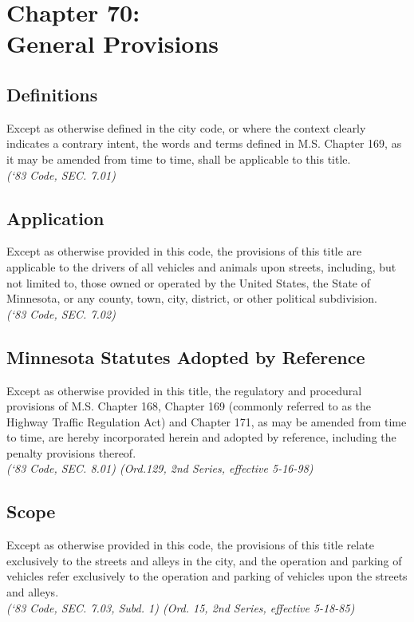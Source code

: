 \chapter*{Chapter 70: \\
	General Provisions}
    \minitoc
    \pagebreak

\section{Definitions}
Except as otherwise defined in the city code, or where the context clearly indicates a contrary intent, the words and terms defined in M.S. Chapter 169, as it may be amended from time to time, shall be applicable to this title.\\
\emph{(‘83 Code, SEC. 7.01)}
\section{Application}
Except as otherwise provided in this code, the provisions of this title are applicable to the drivers of all vehicles and animals upon streets, including, but not limited to, those owned or operated by the United States, the State of Minnesota, or any county, town, city, district, or other political subdivision.\\
\emph{(‘83 Code, SEC. 7.02)}
\section{Minnesota Statutes Adopted by Reference}
Except as otherwise provided in this title, the regulatory and procedural provisions of M.S. Chapter 168, Chapter 169 (commonly referred to as the Highway Traffic Regulation Act) and Chapter 171, as may be amended from time to time, are hereby incorporated herein and adopted by reference, including the penalty provisions thereof.\\
\emph{(‘83 Code, SEC. 8.01) (Ord.129, 2nd Series, effective 5-16-98)}
\section{Scope}
Except as otherwise provided in this code, the provisions of this title relate exclusively to the streets and alleys in the city, and the operation and parking of vehicles refer exclusively to the operation and parking of vehicles upon the streets and alleys.\\
\emph{(‘83 Code, SEC. 7.03, Subd. 1) (Ord. 15, 2nd Series, effective 5-18-85)}
